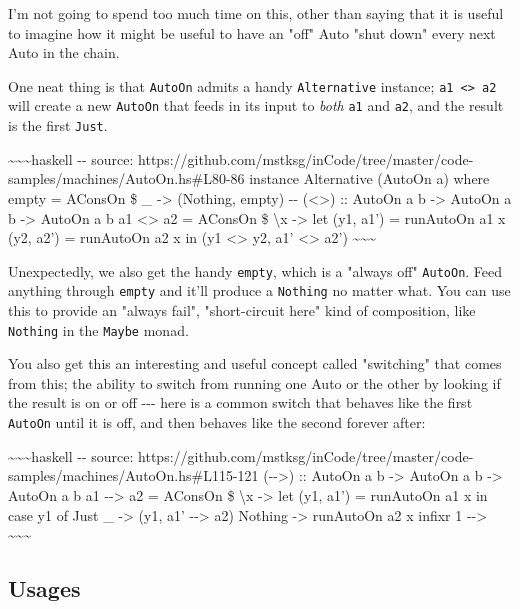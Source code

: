 \documentclass[]{article}
\begin{document}
I'm not going to spend too much time on this, other than saying that it is
useful to imagine how it might be useful to have an "off" Auto "shut down" every
next Auto in the chain.

One neat thing is that \texttt{AutoOn} admits a handy \texttt{Alternative}
instance; \texttt{a1\ \textless{}\textbar{}\textgreater{}\ a2} will create a new
\texttt{AutoOn} that feeds in its input to \emph{both} \texttt{a1} and
\texttt{a2}, and the result is the first \texttt{Just}.

\textasciitilde{}\textasciitilde{}\textasciitilde{}haskell -\/- source:
https://github.com/mstksg/inCode/tree/master/code-samples/machines/AutoOn.hs\#L80-86
instance Alternative (AutoOn a) where empty = AConsOn \$ \_ -\textgreater{}
(Nothing, empty) -\/- (\textless{}\textbar{}\textgreater{}) :: AutoOn a b
-\textgreater{} AutoOn a b -\textgreater{} AutoOn a b a1
\textless{}\textbar{}\textgreater{} a2 = AConsOn \$ \textbackslash{}x
-\textgreater{} let (y1, a1') = runAutoOn a1 x (y2, a2') = runAutoOn a2 x in (y1
\textless{}\textbar{}\textgreater{} y2, a1' \textless{}\textbar{}\textgreater{}
a2') \textasciitilde{}\textasciitilde{}\textasciitilde{}

Unexpectedly, we also get the handy \texttt{empty}, which is a "always off"
\texttt{AutoOn}. Feed anything through \texttt{empty} and it'll produce a
\texttt{Nothing} no matter what. You can use this to provide an "always fail",
"short-circuit here" kind of composition, like \texttt{Nothing} in the
\texttt{Maybe} monad.

You also get this an interesting and useful concept called "switching" that
comes from this; the ability to switch from running one Auto or the other by
looking if the result is on or off -\/-\/- here is a common switch that behaves
like the first \texttt{AutoOn} until it is off, and then behaves like the second
forever after:

\textasciitilde{}\textasciitilde{}\textasciitilde{}haskell -\/- source:
https://github.com/mstksg/inCode/tree/master/code-samples/machines/AutoOn.hs\#L115-121
(-\/-\textgreater{}) :: AutoOn a b -\textgreater{} AutoOn a b -\textgreater{}
AutoOn a b a1 -\/-\textgreater{} a2 = AConsOn \$ \textbackslash{}x
-\textgreater{} let (y1, a1') = runAutoOn a1 x in case y1 of Just \_
-\textgreater{} (y1, a1' -\/-\textgreater{} a2) Nothing -\textgreater{}
runAutoOn a2 x infixr 1 -\/-\textgreater{}
\textasciitilde{}\textasciitilde{}\textasciitilde{}

\subsection{Usages}
\end{document}
